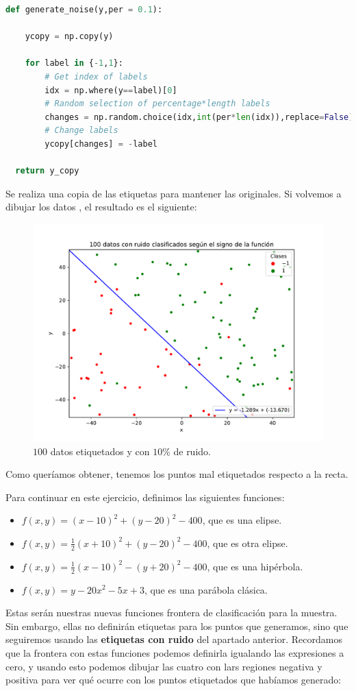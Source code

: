 \documentclass[12pt]{article}
\begin{document}
{\begin{lstlisting}[language=Python]
  def generate_noise(y,per = 0.1):
    
    ycopy = np.copy(y)

    for label in {-1,1}:
        # Get index of labels
        idx = np.where(y==label)[0]
        # Random selection of percentage*length labels
        changes = np.random.choice(idx,int(per*len(idx)),replace=False)
        # Change labels
        ycopy[changes] = -label
      
  return y_copy
\end{lstlisting}

Se realiza una copia de las etiquetas para mantener las originales. Si volvemos a dibujar los datos , el resultado es el siguiente:
\begin{figure}[H]
  \centering
  \includegraphics[scale = 0.4]{media/100-datos-ruido.pdf}
  \caption{$100$ datos etiquetados y con $10\%$ de ruido.}
\end{figure}
Como queríamos obtener, tenemos los puntos mal etiquetados respecto a la recta. 

Para continuar en este ejercicio, definimos las siguientes funciones:
\begin{itemize}
  \item $f(x,y) = (x-10)^2 + (y-20)^2 - 400$, que es una elipse.
  \item $f(x,y) = \frac{1}{2}(x+10)^2 + (y-20)^2 -400$, que es otra elipse.
  \item $f(x,y) = \frac{1}{2}(x - 10)^2 - (y+20)^2 -400$, que es una hipérbola.
  \item $f(x,y) = y - 20x^2 - 5x + 3$, que es una parábola clásica.
\end{itemize}
Estas serán nuestras nuevas funciones frontera de clasificación para la muestra. Sin embargo, ellas no definirán etiquetas para los puntos que generamos, sino que seguiremos usando las \textbf{etiquetas con ruido} del apartado anterior. Recordamos que la frontera con estas funciones podemos definirla igualando las expresiones a cero, y usando esto podemos dibujar las cuatro con lars regiones negativa y positiva para ver qué ocurre con los puntos etiquetados que habíamos generado:

}
\end{document}
